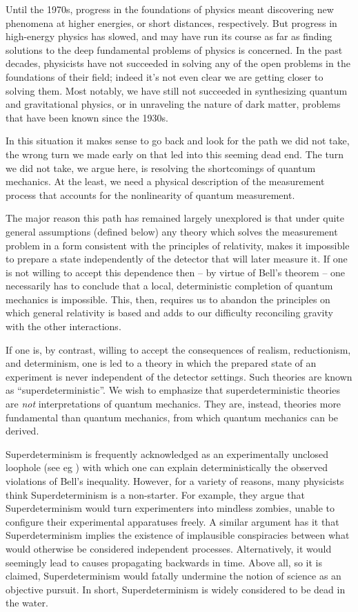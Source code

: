 \documentclass[12pt]{article}
\begin{document}
Until the 1970s, progress in the foundations of physics meant discovering
new phenomena at higher energies, or short distances, respectively. But
progress in high-energy physics has slowed, and may have run its course as 
far as finding solutions to the deep fundamental problems of physics is concerned. 
In the past decades, physicists have not succeeded in solving any of the open problems in the
foundations of their field; indeed it's not even clear we are getting closer to solving them.  
Most notably, we have still not succeeded in synthesizing quantum and gravitational physics, 
or in unraveling the nature of dark matter, problems that have been 
known since the 1930s. 

In this situation it makes sense to go back and look for the path we
did not take, the wrong turn we made early on that led into this seeming dead end. The turn we did not take, we argue here, is resolving the
shortcomings of quantum mechanics. At the least, we need a physical description of the measurement process that accounts for the nonlinearity of quantum measurement. 

The major reason this path has remained largely unexplored is that
under quite general assumptions (defined below)  any theory which solves the measurement 
problem in a form consistent with the principles of relativity, makes it impossible to prepare a
state independently of the detector that will later measure it. If one is not willing to accept
this dependence then -- by virtue of Bell's theorem \cite{Bell} -- one necessarily
has to conclude that a local, deterministic completion of quantum mechanics
is impossible. This, then, requires us to abandon the principles on which general relativity is
based and adds to our difficulty reconciling gravity with the
other interactions.

If one is, by contrast, willing to accept the consequences of realism, reductionism, and determinism, one is led to a theory in which the prepared state of an experiment is never independent of the detector settings. Such theories are known as ``superdeterministic''. We wish to emphasize that superdeterministic theories are {\sl not} interpretations of quantum mechanics. They are, instead, theories more fundamental than quantum mechanics, from which quantum mechanics can be derived. 

Superdeterminism is frequently acknowledged as an experimentally unclosed loophole (see eg \cite{Gallicchio:2013iva}) with which one can explain deterministically the observed violations of Bell's inequality. However, for a variety of reasons, many physicists think Superdeterminism is a non-starter. For example, they argue that Superdeterminism would turn experimenters into mindless zombies, unable to configure their experimental apparatuses freely. 
A similar argument has it that Superdeterminism implies the existence of 
implausible conspiracies between what would otherwise be considered independent processes. Alternatively, it would seemingly lead to causes propagating backwards in time. Above all, so it is claimed, Superdeterminism would fatally undermine the notion of science as an objective pursuit. In short, Superdeterminism is widely considered to be dead in the water. 
\end{document}
